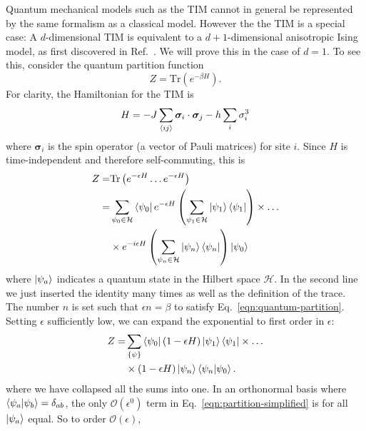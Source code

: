 \documentclass[
  amsmath,
  amssymb,
  aps,
  twocolumn,
  nofootinbib,
  nolongbibliography,
  floatfix,
]{revtex4-2}
\newcommand{\parens}[1]{\left ( #1 \right )}
\begin{document}
Quantum mechanical models such as the TIM cannot in general be represented by the same formalism as a classical model. However the the TIM is a special case: A $d$-dimensional TIM is equivalent to a $d+1$-dimensional anisotropic Ising model, as first discovered in Ref.~\cite{schultz64two}. We will prove this in the case of $d=1$. To see this, consider the quantum partition function
\begin{equation}
  Z = \mathrm{Tr}\parens{e^{-\beta H}}.
  \label{eqn:quantum-partition}
\end{equation}
For clarity, the Hamiltonian for the TIM is
\begin{equation}
  H = -J \sum_{\braket{ij}}\bm \sigma_i \cdot \bm \sigma_j - h \sum_i\sigma_i^3
\end{equation}
where $\bm \sigma_i$ is the spin operator (a vector of Pauli matrices) for site $i$. Since $H$ is time-independent and therefore self-commuting, this is 
\begin{equation}
  \begin{split}
    Z =& \mathrm{Tr}\parens{e^{-\epsilon H}\dots e^{-\epsilon H}}\\
     =& \sum_{\psi_0\in\mathcal{H}}\bra{\psi_0}e^{-\epsilon H}\parens{\sum_{\psi_1\in\mathcal{H}}\ket{\psi_1}\bra{\psi_1}}\times\dots\\
     &\times e^{-i\epsilon H}\parens{\sum_{\psi_n\in\mathcal{H}}\ket{\psi_n}\bra{\psi_n}}\ket{\psi_0}
  \end{split}
\end{equation}
where $\ket{\psi_a}$ indicates a quantum state in the Hilbert space $\mathcal{H}$. In the second line we just inserted the identity many times as well as the definition of the trace. The number $n$ is set such that $\epsilon n = \beta$ to satisfy Eq.~\ref{eqn:quantum-partition}. Setting $\epsilon$ sufficiently low, we can expand the exponential to first order in $\epsilon$:
\begin{equation}
  \begin{split}
    Z =& \sum_{\{\psi\}}\bra{\psi_0}(1 - \epsilon H)\ket{\psi_1}\bra{\psi_1}\times\dots\\
    &\times (1 - \epsilon H)\ket{\psi_n}\braket{\psi_n|\psi_0}.
  \end{split}
  \label{eqn:partition-simplified}
\end{equation}
where we have collapsed all the sums into one. In an orthonormal basis where $\braket{\psi_a|\psi_b} = \delta_{ab}$, the only $\mathcal{O}(\epsilon^0)$ term in Eq.~\ref{eqn:partition-simplified} is for all $\ket{\psi_a}$ equal. So to order $\mathcal{O}(\epsilon)$,
\end{document}
